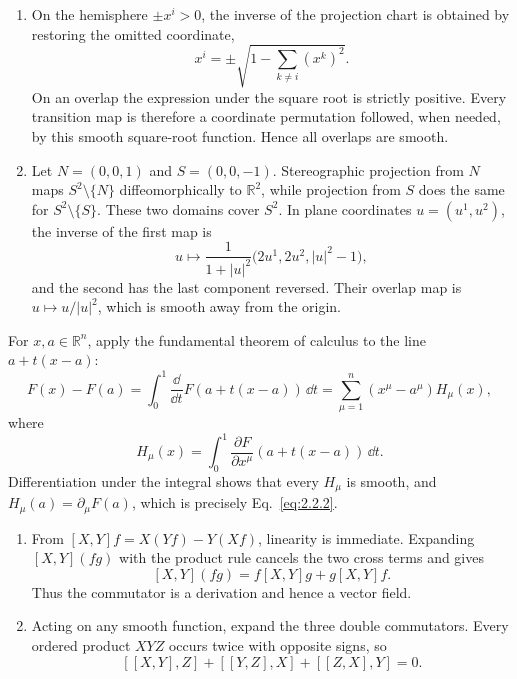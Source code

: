 \ExerciseEditorialNote

\begin{enumerate}[leftmargin=2.8em,itemsep=1.2em]
\begin{enumerate}[label=\alph*),leftmargin=2em]
\item On the hemisphere \(\pm x^i>0\), the inverse of the projection chart is
obtained by restoring the omitted coordinate,
\[
 x^i=\pm\sqrt{1-\sum_{k\ne i}(x^k)^2}.
\]
On an overlap the expression under the square root is strictly positive.
Every transition map is therefore a coordinate permutation followed, when
needed, by this smooth square-root function.  Hence all overlaps are smooth.

\item Let \(N=(0,0,1)\) and \(S=(0,0,-1)\).  Stereographic projection from
\(N\) maps \(S^2\setminus\{N\}\) diffeomorphically to \(\mathbb R^2\), while
projection from \(S\) does the same for \(S^2\setminus\{S\}\).  These two
domains cover \(S^2\).  In plane coordinates \(u=(u^1,u^2)\), the inverse of
the first map is
\[
 u\longmapsto\frac{1}{1+|u|^2}
 \bigl(2u^1,2u^2,|u|^2-1\bigr),
\]
and the second has the last component reversed.  Their overlap map is
\(u\mapsto u/|u|^2\), which is smooth away from the origin.
\end{enumerate}

For \(x,a\in\mathbb R^n\), apply the fundamental theorem of calculus to the
line \(a+t(x-a)\):
\[
 F(x)-F(a)=\int_0^1\frac{\dd}{\dd t}F(a+t(x-a))\,\dd t
 =\sum_{\mu=1}^n(x^\mu-a^\mu)H_\mu(x),
\]
where
\[
 H_\mu(x)=\int_0^1
 \frac{\partial F}{\partial x^\mu}(a+t(x-a))\,\dd t.
\]
Differentiation under the integral shows that every \(H_\mu\) is smooth, and
\(H_\mu(a)=\partial_\mu F(a)\), which is precisely Eq.~\eqref{eq:2.2.2}.

\begin{enumerate}[label=\alph*),leftmargin=2em]
\item From \([X,Y]f=X(Yf)-Y(Xf)\), linearity is immediate.  Expanding
\([X,Y](fg)\) with the product rule cancels the two cross terms and gives
\[
 [X,Y](fg)=f[X,Y]g+g[X,Y]f.
\]
Thus the commutator is a derivation and hence a vector field.

\item Acting on any smooth function, expand the three double commutators.
Every ordered product \(XYZ\) occurs twice with opposite signs, so
\[
 [[X,Y],Z]+[[Y,Z],X]+[[Z,X],Y]=0.
\]


\end{enumerate}
\end{enumerate}
